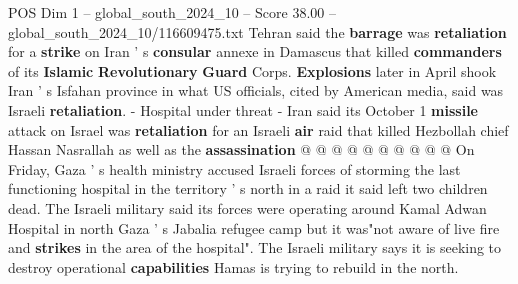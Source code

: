 \begin{textsample}{POS Dim 1 – global\_south\_2024\_10 – Score 38.00 – global\_south\_2024\_10/116609475.txt}
Tehran said the \textbf{barrage} was \textbf{retaliation} for a \textbf{strike} on Iran ' s \textbf{consular} annexe in Damascus that killed \textbf{commanders} of its \textbf{Islamic} \textbf{Revolutionary} \textbf{Guard} Corps. \textbf{Explosions} later in April shook Iran ' s Isfahan province in what US officials, cited by American media, said was Israeli \textbf{retaliation}. - Hospital under threat - Iran said its October 1 \textbf{missile} attack on Israel was \textbf{retaliation} for an Israeli \textbf{air} raid that killed Hezbollah chief Hassan Nasrallah as well as the \textbf{assassination} @ @ @ @ @ @ @ @ @ @ On Friday, Gaza ' s health ministry accused Israeli forces of storming the last functioning hospital in the territory ' s north in a raid it said left two children dead.
The Israeli military said its forces were operating around Kamal Adwan Hospital in north Gaza ' s Jabalia refugee camp but it was"not aware of live fire and \textbf{strikes} in the area of the hospital".
The Israeli military says it is seeking to destroy operational \textbf{capabilities} Hamas is trying to rebuild in the north.

\end{textsample}
